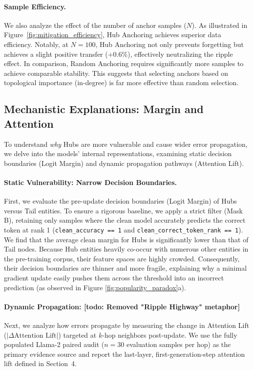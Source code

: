 \paragraph{Sample Efficiency.}
We also analyze the effect of the number of anchor samples ($N$). As illustrated in Figure~\ref{fig:mitigation_efficiency}, Hub Anchoring achieves superior data efficiency. Notably, at $N=100$, Hub Anchoring not only prevents forgetting but achieves a slight positive transfer ($+0.6\%$), effectively neutralizing the ripple effect. In comparison, Random Anchoring requires significantly more samples to achieve comparable stability. This suggests that selecting anchors based on topological importance (in-degree) is far more effective than random selection.

\subsection{Mechanistic Explanations: Margin and Attention}
\label{subsec:mechanisms}

To understand \textit{why} Hubs are more vulnerable and cause wider error propagation, we delve into the models' internal representations, examining static decision boundaries (Logit Margin) and dynamic propagation pathways (Attention Lift).

\paragraph{Static Vulnerability: Narrow Decision Boundaries.}
First, we evaluate the pre-update decision boundaries (Logit Margin) of Hubs versus Tail entities. To ensure a rigorous baseline, we apply a strict filter (Mask B), retaining only samples where the clean model accurately predicts the correct token at rank 1 (\texttt{clean\_accuracy == 1} and \texttt{clean\_correct\_token\_rank == 1}). We find that the average clean margin for Hubs is significantly lower than that of Tail nodes. Because Hub entities heavily co-occur with numerous other entities in the pre-training corpus, their feature spaces are highly crowded. Consequently, their decision boundaries are thinner and more fragile, explaining why a minimal gradient update easily pushes them across the threshold into an incorrect prediction (as observed in Figure \ref{fig:popularity_paradox}a).

\paragraph{Dynamic Propagation: [todo: Removed "Ripple Highway" metaphor]}
Next, we analyze how errors propagate by measuring the change in Attention Lift ($|\Delta \text{Attention Lift}|$) targeted at $k$-hop neighbors post-update. We use the fully populated Llama-2 paired audit ($n=30$ evaluation samples per hop) as the primary evidence source and report the last-layer, first-generation-step attention lift defined in Section~4.

